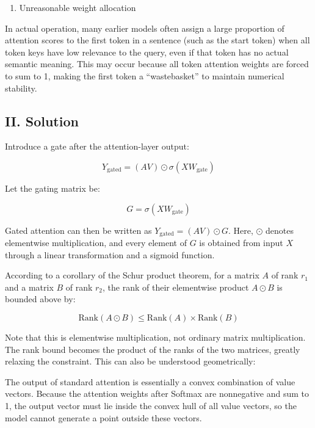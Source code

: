 \begin{enumerate}
\def\labelenumi{\arabic{enumi}.}
\setcounter{enumi}{1}
\tightlist
\item
  Unreasonable weight allocation
\end{enumerate}

In actual operation, many earlier models often assign a large proportion of attention scores to the first token in a sentence (such as the start token) when all token keys have low relevance to the query, even if that token has no actual semantic meaning. This may occur because all token attention weights are forced to sum to 1, making the first token a ``wastebasket'' to maintain numerical stability.

\hypertarget{ii.-solution}{%
\subsection{II. Solution}\label{ii.-solution}}

Introduce a gate after the attention-layer output:

\[
Y_{\mathrm{gated}}=(AV)\odot\sigma(XW_{\mathrm{gate}})
\]

Let the gating matrix be:

\[
G=\sigma(XW_{\mathrm{gate}})
\]

Gated attention can then be written as \(Y_{\mathrm{gated}}=(AV)\odot G\). Here, \(\odot\) denotes elementwise multiplication, and every element of \(G\) is obtained from input \(X\) through a linear transformation and a sigmoid function.

According to a corollary of the Schur product theorem, for a matrix \(A\) of rank \(r_1\) and a matrix \(B\) of rank \(r_2\), the rank of their elementwise product \(A\odot B\) is bounded above by:

\[
\mathrm{Rank}(A\odot B)\le \mathrm{Rank}(A)\times \mathrm{Rank}(B)
\]

Note that this is elementwise multiplication, not ordinary matrix multiplication. The rank bound becomes the product of the ranks of the two matrices, greatly relaxing the constraint. This can also be understood geometrically:

The output of standard attention is essentially a convex combination of value vectors. Because the attention weights after Softmax are nonnegative and sum to 1, the output vector must lie inside the convex hull of all value vectors, so the model cannot generate a point outside these vectors.

